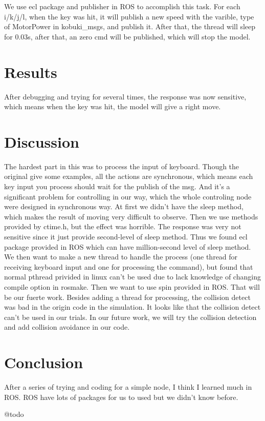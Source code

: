 \documentclass[preprint,pre,floats,aps,amsmath,amssymb]{revtex4}
\begin{document}
We use ecl package and publisher in ROS to accomplish this task. For each i/k/j/l, when the key was hit, it will publish a new speed with the varible, type of MotorPower in kobuki\_msgs, and publish it. After that, the thread will sleep for 0.03s, after that, an zero cmd will be published, which will stop the model.

\section{Results}
\label{sec:results}

After debugging and trying for several times, the response was now sensitive, which means when the key was hit, the model will give a right move.

\section{Discussion}
\label{sec:discussion}

The hardest part in this was to process the input of keyboard. Though the original give some examples, all the actions are synchronous, which means each key input you process should wait for the publish of the msg. And it's a significant problem for controlling in our way, which the whole controling node were designed in synchronous way. At first we didn't have the sleep method, which makes the result of moving very difficult to observe. Then we use methods provided by ctime.h, but the effect was horrible. The response was very not sensitive since it just provide second-level of sleep method. Thus we found ecl package provided in ROS which can have million-second level of sleep method. We then want to make a new thread to handle the process (one thread for receiving keyboard input and one for processing the command), but found that normal pthread privided in linux can't be used due to lack knowledge of changing compile option in rosmake. Then we want to use spin provided in ROS. That will be our fuerte work. Besides adding a thread for processing, the collision detect was bad in the origin code in the simulation. It looks like that the collision detect can't be used in our trials. In our future work, we will try the collision detection and add collision avoidance in our code.

\section{Conclusion}
\label{sec:conclusion}

After a series of trying and coding for a simple node, I think I learned much in ROS. ROS have lots of packages for us to used but we didn't know before.

\begin{acknowledgments}
@todo
\end{acknowledgments}
\end{document}
